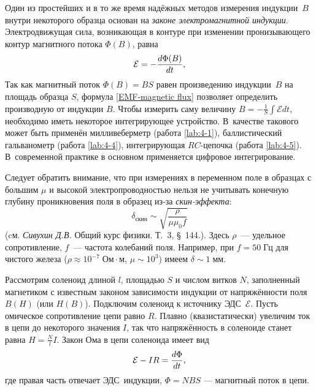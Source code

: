 
Один из простейших и в то же время надёжных методов измерения
индукции~$B$ внутри некоторого образца основан
на \emph{законе электромагнитной индукции}.
Электродвижущая сила, возникающая в контуре при изменении
пронизывающего контур магнитного потока $\Phi(B)$, равна
\begin{equation}
	\eqmark{EMF-magnetic flux}
	\mathcal{E} = - \frac{d\Phi (B)}{dt},
\end{equation}
Так как магнитный поток $\Phi (B)=BS$ равен произведению индукции~$B$ на площадь
образца $S$, формула \eqref{EMF-magnetic flux} позволяет определить производную от
индукции $B$. Чтобы измерить саму величину $B=-\frac1{S}\int \mathcal{E} dt$,
необходимо иметь некоторое интегрирующее устройство.
В~качестве такового может быть применён милливеберметр 
(работа \ref{lab:4-1}),
баллистический гальванометр (работа \ref{lab:4-4}), интегрирующая $RC$-цепочка
(работа \ref{lab:4-5}). 
В~современной практике в основном применяется цифровое интегрирование.

\begin{lab:note}
Следует обратить внимание, что при измерениях в переменном поле
в образцах с большим $\mu$ и высокой электропроводностью
нельзя не учитывать конечную глубину
проникновения поля в образец из-за \emph{скин-эффекта}:
\begin{equation*}
\delta_{скин} \sim \sqrt{\frac{\rho}{\mu \mu_0 f}}
\end{equation*}
(cм. \textit{Сивухин Д.В.} Общий курс физики. Т.~3, \S~144.).
Здесь $\rho$~--- удельное сопротивление, $f$~--- частота колебаний поля.
Например, при $f=50\;Гц$ для чистого железа ($\rho \approx 10^{-7}\;Ом\cdot м$,
$\mu \sim 10^3$) имеем $\delta \sim 1\;мм$.
\end{lab:note}

\label{sec:forces}


Рассмотрим соленоид длиной $l$, площадью $S$ и числом витков $N$,
заполненный магнетиком с известным законом зависимости индукции от напряжённости
поля $B(H)$ (или $H(B)$). Подключим соленоид к источнику ЭДС~$\mathcal{E}$.
Пусть омическое сопротивление цепи равно $R$.
Плавно (квазистатически) увеличим ток в цепи до некоторого значения
$I$, так что напряжённость в соленоиде станет равна
$H = \frac{N}{l} I$. Закон Ома в цепи соленоида имеет вид
\begin{equation}
    \eqmark{OhmLaw-solenoid}
\mathcal{E} - IR = \frac{d\Phi}{dt},
\end{equation}
где правая часть отвечает ЭДС~индукции, $\Phi = NBS$ --- магнитный поток в
цепи.

